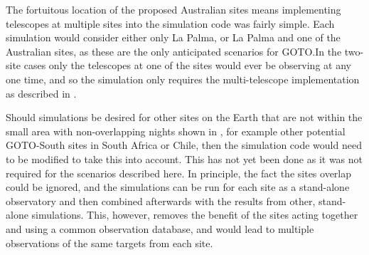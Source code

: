 \begin{colsection}
The fortuitous location of the proposed Australian sites means implementing telescopes at multiple sites into the simulation code was fairly simple. Each simulation would consider either only La Palma, or La Palma and one of the Australian sites, as these are the only anticipated scenarios for GOTO.\@ In the two-site cases only the telescopes at one of the sites would ever be observing at any one time, and so the simulation only requires the multi-telescope implementation as described in .

Should simulations be desired for other sites on the Earth that are not within the small area with non-overlapping nights shown in , for example other potential GOTO-South sites in South Africa or Chile, then the simulation code would need to be modified to take this into account. This has not yet been done as it was not required for the scenarios described here. In principle, the fact the sites overlap could be ignored, and the simulations can be run for each site as a stand-alone observatory and then combined afterwards with the results from other, stand-alone simulations. This, however, removes the benefit of the sites acting together and using a common observation database, and would lead to multiple observations of the same targets from each site.

\end{colsection}


